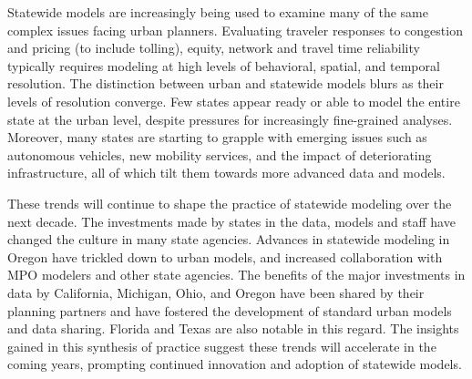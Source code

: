 Statewide models are increasingly being used to examine many of the same complex issues facing urban planners. Evaluating traveler responses to congestion and pricing (to include tolling), equity, network and travel time reliability typically requires modeling at high levels of behavioral, spatial, and temporal resolution. The distinction between urban and statewide models blurs as their levels of resolution converge. Few states appear ready or able to model the entire state at the urban level, despite pressures for increasingly fine-grained analyses. Moreover, many states are starting to grapple with emerging issues such as autonomous vehicles, new mobility services, and the impact of deteriorating infrastructure, all of which tilt them towards more advanced data and models.

These trends will continue to shape the practice of statewide modeling over the next decade. The investments made by states in the data, models and staff have changed the culture in many state agencies. Advances in statewide modeling in Oregon have trickled down to urban models, and increased collaboration with MPO modelers and other state agencies. The benefits of the major investments in data by California, Michigan, Ohio, and Oregon have been shared by their planning partners and have fostered the development of standard urban models and data sharing. Florida and Texas are also notable in this regard. The insights gained in this synthesis of practice suggest these trends will accelerate in the coming years, prompting continued innovation and adoption of statewide models. 
